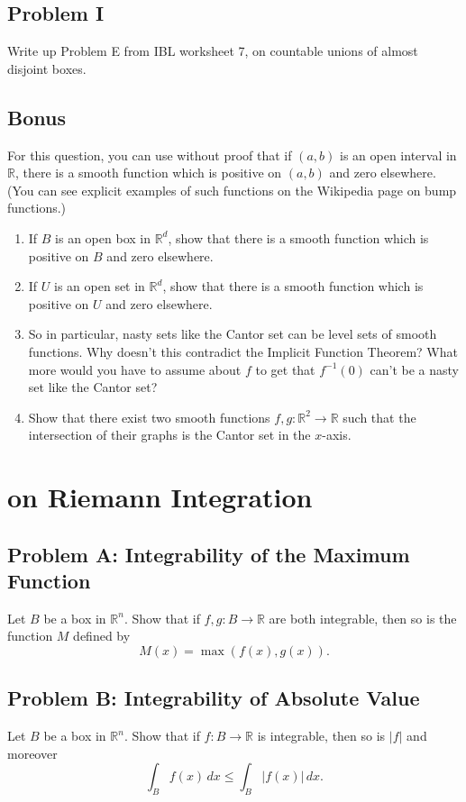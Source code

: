 \documentclass[lang=cn,11pt]{template}
\begin{document}
\section*{Problem I}
Write up Problem E from IBL worksheet 7, on countable unions of almost disjoint boxes.

\section*{Bonus}
For this question, you can use without proof that if $(a, b)$ is an open interval in $\mathbb{R}$, there is a smooth function which is positive on $(a, b)$ and zero elsewhere. (You can see explicit examples of such functions on the Wikipedia page on bump functions.)
\begin{enumerate}
    \item If $B$ is an open box in $\mathbb{R}^d$, show that there is a smooth function which is positive on $B$ and zero elsewhere.
    \item If $U$ is an open set in $\mathbb{R}^d$, show that there is a smooth function which is positive on $U$ and zero elsewhere.
    \item So in particular, nasty sets like the Cantor set can be level sets of smooth functions. Why doesn’t this contradict the Implicit Function Theorem? What more would you have to assume about $f$ to get that $f^{-1}(0)$ can’t be a nasty set like the Cantor set?
    \item Show that there exist two smooth functions $f, g : \mathbb{R}^2 \to \mathbb{R}$ such that the intersection of their graphs is the Cantor set in the $x$-axis.
\end{enumerate}




\chapter{on Riemann Integration}

\section*{Problem A: Integrability of the Maximum Function}
Let \( B \) be a box in \( \mathbb{R}^n \). Show that if \( f, g : B \rightarrow \mathbb{R} \) are both integrable, then so is the function \( M \) defined by
\[
M(x) = \max(f(x), g(x)).
\]

\section*{Problem B: Integrability of Absolute Value}
Let \( B \) be a box in \( \mathbb{R}^n \). Show that if \( f : B \rightarrow \mathbb{R} \) is integrable, then so is \( |f| \) and moreover
\[
\int_B f(x) \, dx \leq \int_B |f(x)| \, dx.
\]
\end{document}
